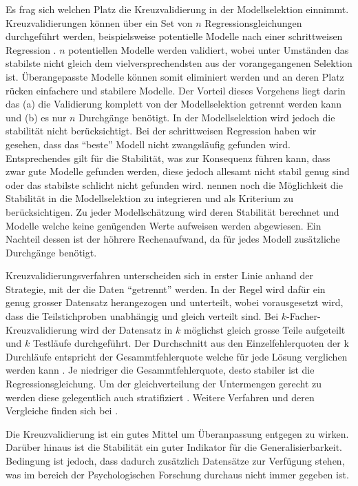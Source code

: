 \documentclass[english,12pt,doc]{apa}
\begin{document}
Es frag sich welchen Platz die Kreuzvalidierung in der Modellselektion einnimmt.
Kreuzvalidierungen können über ein Set von $n$ Regressionsgleichungen durchgeführt werden, beispielsweise  potentielle Modelle nach einer schrittweisen Regression \cite[p. 12]{arlot2010survey}.
$n$ potentiellen Modelle werden validiert, wobei unter Umständen das stabilste nicht gleich dem vielversprechendsten aus der vorangegangenen Selektion ist.
 Überangepasste Modelle können somit eliminiert werden und an deren Platz rücken einfachere und stabilere Modelle.
Der Vorteil dieses Vorgehens liegt darin das (a) die Validierung komplett von der Modellselektion getrennt werden kann und (b) es nur $n$ Durchgänge benötigt. 
In der Modellselektion wird jedoch die stabilität nicht berücksichtigt. 
Bei der schrittweisen Regression haben wir gesehen, dass das ``beste'' Modell nicht zwangsläufig gefunden wird.
Entsprechendes gilt für die Stabilität, was zur Konsequenz führen kann, dass zwar gute Modelle gefunden werden, diese jedoch allesamt nicht stabil genug sind oder das stabilste schlicht nicht gefunden wird. 
 nennen noch die Möglichkeit die Stabilität in die Modellselektion zu integrieren und als  Kriterium zu berücksichtigen. 
Zu jeder Modellschätzung wird deren Stabilität berechnet und Modelle welche keine genügenden Werte aufweisen werden abgewiesen. 
Ein Nachteil dessen ist der höhrere Rechenaufwand, da für jedes Modell zusätzliche Durchgänge benötigt. 

Kreuzvalidierungsverfahren unterscheiden sich in erster Linie anhand der Strategie, mit der die Daten ``getrennt'' werden.
In der Regel wird dafür ein genug grosser Datensatz herangezogen und unterteilt, wobei vorausgesetzt wird, dass die Teilstichproben unabhängig und gleich verteilt sind. 
Bei $k$-Facher-Kreuzvalidierung wird der Datensatz in $k$ möglichst gleich grosse Teile aufgeteilt und $k$ Testläufe durchgeführt.
 Der Durchschnitt aus den Einzelfehlerquoten der k Durchläufe entspricht der Gesammtfehlerquote welche für jede Lösung verglichen werden kann \cite[p. 14]{arlot2010survey}.
Je niedriger die Gesammtfehlerquote, desto stabiler ist die Regressionsgleichung.
Um der gleichverteilung der Untermengen gerecht zu werden diese gelegentlich auch stratifiziert \cite{diamantidis2000unsupervised}. 
Weitere Verfahren und deren Vergleiche finden sich bei .

Die Kreuzvalidierung ist ein gutes Mittel um Überanpassung entgegen zu wirken.
Darüber hinaus ist die Stabilität ein guter Indikator für die Generalisierbarkeit.
Bedingung ist jedoch, dass dadurch zusätzlich Datensätze zur Verfügung stehen, was im bereich der Psychologischen Forschung durchaus nicht immer gegeben ist.
\end{document}
